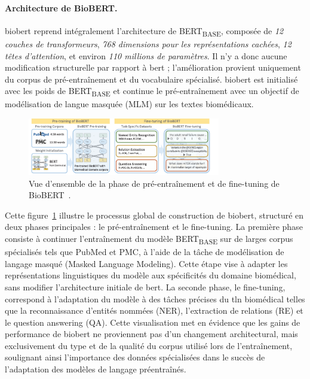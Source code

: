 \documentclass[12pt]{report}
\begin{document}
\paragraph{Architecture de BioBERT.} \gls{biobert} reprend intégralement l'architecture de BERT\textsubscript{BASE}, composée de \textit{12 couches de transformeurs}, \textit{768 dimensions pour les représentations cachées}, \textit{12 têtes d’attention}, et environ \textit{110 millions de paramètres}. Il n’y a donc aucune modification structurelle par rapport à \gls{bert} ; l'amélioration provient uniquement du corpus de pré-entraînement et du vocabulaire spécialisé. \gls{biobert} est initialisé avec les poids de BERT\textsubscript{BASE} et continue le pré-entraînement avec un objectif de modélisation de langue masquée (MLM) sur les textes biomédicaux.

\begin{figure}[H]
    \centering
    \includegraphics[width=0.75\textwidth]{biobert.png}
    \caption{Vue d'ensemble de la phase de pré-entraînement et de fine-tuning de BioBERT~\cite{lee2020biobert}.}
    \label{fig:biobert_architecture}
\end{figure}

Cette figure~\ref{fig:biobert_architecture} illustre le processus global de construction de \gls{biobert}, structuré en deux phases principales : le pré-entraînement et le fine-tuning. La première phase consiste à continuer l’entraînement du modèle BERT\textsubscript{BASE} sur de larges corpus spécialisés tels que PubMed et PMC, à l’aide de la tâche de modélisation de langage masqué (Masked Language Modeling). Cette étape vise à adapter les représentations linguistiques du modèle aux spécificités du domaine biomédical, sans modifier l’architecture initiale de \gls{bert}. La seconde phase, le fine-tuning, correspond à l’adaptation du modèle à des tâches précises du \gls{tln} biomédical telles que la reconnaissance d’entités nommées (NER), l’extraction de relations (RE) et le question answering (QA). Cette visualisation met en évidence que les gains de performance de \gls{biobert} ne proviennent pas d’un changement architectural, mais exclusivement du type et de la qualité du corpus utilisé lors de l’entraînement, soulignant ainsi l’importance des données spécialisées dans le succès de l’adaptation des modèles de langage préentraînés.
\end{document}
